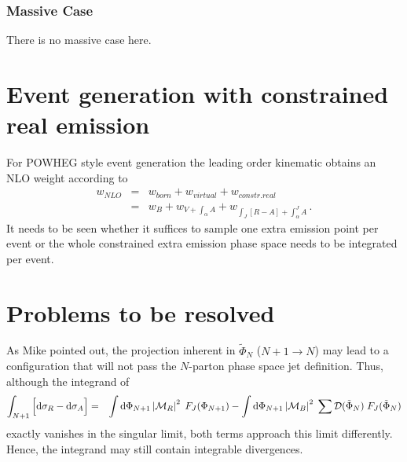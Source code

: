 \documentclass[a4paper,10pt]{scrartcl}
\newcommand{\done}{{\rm d}}
\newcommand{\nnb}{\nonumber}
\begin{document}
\subsubsection*{Massive Case}
 There is no massive case here.





\section{Event generation with constrained real emission}

For POWHEG style event generation the leading order kinematic obtains an NLO
weight according to
\begin{eqnarray}
 w_{NLO}
& = & w_{born} + w_{virtual} + w_{constr. real} \nnb\\
& = & w_B + w_{V+\int_\alpha A} + w_{\int_J[R-A]+\int_\alpha^JA} \,.
\end{eqnarray}
It needs to be seen whether it suffices to sample one extra emission point
per event or the whole constrained extra emission phase space needs to be
integrated per event.




\section{Problems to be resolved}

As Mike pointed out, the projection inherent in $\tilde\Phi_N$ ($N+1\to N$)
may lead to a configuration that will not pass the $N$-parton phase space jet
definition. Thus, although the integrand of
\begin{eqnarray}
 \int_{N+1}\Big[\done\sigma_R-\done\sigma_A\Big]
& = & \int\done\Phi_{N+1} \left|\mathcal{M}_R\right|^2\;F_J(\Phi_{N+1})
	- \int\done\Phi_{N+1} \left|\mathcal{M}_B\right|^2\;
	  \sum\mathcal{D}(\tilde\Phi_N)\;F_J(\tilde\Phi_N)
\end{eqnarray}
exactly vanishes in the singular limit, both terms approach this limit differently.
Hence, the integrand may still contain integrable divergences.
\end{document}
